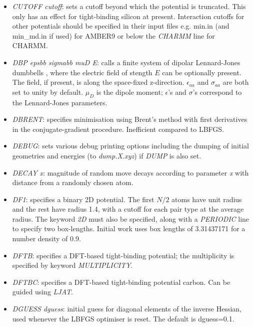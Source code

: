 \documentclass[12pt,a4paper,dvips]{article}
\begin{document}
\begin{itemize}
\item {\it CUTOFF cutoff\/}: sets a cutoff beyond which the potential is truncated. This
only has an effect for tight-binding silicon at present. Interaction cutoffs for other potentials
should be specified in their input files e.g. {\textrm min.in} (and {\textrm min\_md.in} if used) 
for AMBER9 or below the {\it CHARMM} line for CHARMM.

\item {\it DBP epsbb sigmabb muD E\/}: calls
a finite system of dipolar Lennard-Jones dumbbells \cite{ChakrabartiFW09}, where the electric field of stength $E$ can be
optionally present. The field, if present, is along the space-fixed z-direction. $\epsilon_{aa}$
and $\sigma_{aa}$ are both set to unity by default. $\mu_{D}$ is the dipole moment; $\epsilon$'s
and $\sigma$'s correspond to the Lennard-Jones parameters.

\item {\it DBRENT}: specifies minimisation using Brent's method with first derivatives in the
conjugate-gradient procedure. 
Inefficient compared to LBFGS.

\item {\it DEBUG\/}: sets various debug printing options including the dumping of initial
geometries and energies (to {\it dump.X.xyz\/}) if {\it DUMP} is also set.

\item {\it DECAY x\/}: magnitude of random move decays according to parameter
{\it x\/} with distance from a randomly chosen atom.

\item {\it DF1\/}: specifies a binary 2D potential.
The first $N/2$ atoms have unit radius and the rest
have radius 1.4, with a cutoff for each pair type at the
average radius.
The keyword {\it 2D\/} must also be specified, along with a
{\it PERIODIC\/} line to specify two box-lengths.
Initial work uses box lengths of 3.31437171 for a number density of 0.9.

\item {\it DFTB\/}: specifies a DFT-based tight-binding potential; the multiplicity is specified by
keyword {\it MULTIPLICITY\/}.

\item {\it DFTBC\/}: specifies a DFT-based tight-binding potential carbon.
Can be guided using {\it LJAT\/}.

\item {\it DGUESS dguess\/}: initial guess for diagonal elements of the inverse
      Hessian, used whenever the LBFGS optimiser is reset. 
      The default is dguess=0.1.


\end{itemize}
\end{document}
